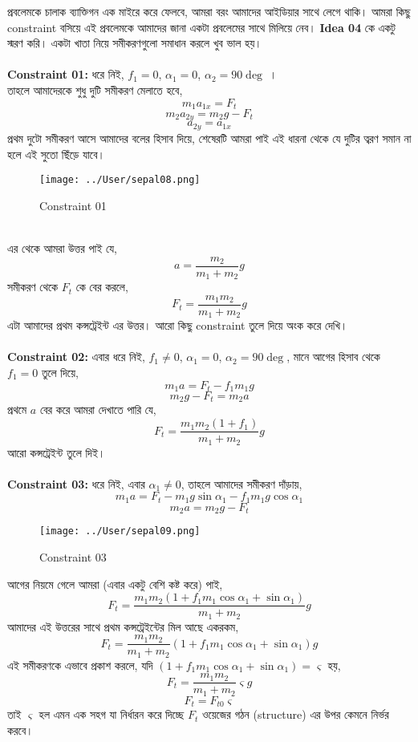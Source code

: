 \documentclass[12pt,a4paper]{article}
\begin{document}
প্রবলেমকে চালাক ব্যাক্তিগন এক মাইরে করে ফেলবে, আমরা বরং আমাদের আইডিয়ার সাথে লেগে থাকি। আমরা কিছু constraint বসিয়ে এই প্রবলেমকে আমাদের জানা একটা প্রবলেমের সাথে মিলিয়ে নেব। \textbf{Idea 04} কে একটু স্মরণ করি। একটা খাতা নিয়ে  সমীকরণগুলো সমাধান করলে খুব ভাল হয়। \\
\\
\textbf{Constraint 01:} ধরে নিই, $f_1 = 0$, $ \alpha_1 = 0$, $ \alpha_2 = 90\deg$ ।\\ 
তাহলে আমাদেরকে শুধু দুটি সমীকরণ মেলাতে হবে, 
\[ m_1 a_{1x} = F_t \]
\[ m_2 a_{2y} = m_2g - F_t \]
\[ a_{2y} = a_{1x} \]
প্রথম দুটো সমীকরণ আসে আমাদের বলের হিসাব দিয়ে, শেষেরটি আমরা পাই এই ধারনা থেকে যে দুটির ত্বরণ সমান না হলে এই সুতো ছিঁড়ে যাবে। \\
\begin{figure}
\texttt{[image: ../User/sepal08.png]}
\centering
\caption{Constraint 01}
\end{figure}\\
এর থেকে আমরা উত্তর পাই যে,
\[ a = \frac{m_2}{m_1 + m_2} g \]
সমীকরণ থেকে $F_t$ কে বের করলে,
\[F_t = \frac{m_1m_2}{m_1 + m_2} g \]
এটা আমাদের প্রথম কন্সট্রেইন্ট এর উত্তর। আরো কিছু constraint তুলে দিয়ে অংক করে দেখি। \\
\\
\textbf{Constraint 02:} এবার ধরে নিই, $f_1 \neq 0$, $ \alpha_1 = 0$, $ \alpha_2 = 90\deg$, মানে আগের হিসাব থেকে $f_1 = 0$ তুলে দিয়ে, 
\[ m_1 a = F_t - f_1 m_1 g \]
\[ m_2 g - F_t = m_2 a \]
প্রথমে $a$ বের করে আমরা দেখাতে পারি যে,
\[ F_t =  \frac{m_1m_2 (1 + f_1) }{m_1 + m_2} g \]
আরো কন্সট্রেইন্ট তুলে দিই। \\
\\
\textbf{Constraint 03:} ধরে নিই, এবার $\alpha_1 \neq 0$, তাহলে আমাদের সমীকরণ দাঁড়ায়, 
\[ m_1 a = F_t - m_1 g \sin \alpha_1 - f_1 m_1 g \cos \alpha_1 \]
\[ m_2 a = m_2g - F_t \]
\begin{figure}[hbtp]
\centering
\texttt{[image: ../User/sepal09.png]}
\caption{Constraint 03}
\end{figure}
আগের নিয়মে গেলে আমরা (এবার একটু বেশি কষ্ট করে) পাই, %
\[ F_t = \frac{m_1 m_2 (1 + f_1 m_1 \cos \alpha_1 + \sin \alpha_1)}
  {m_1 + m_2} g \]
আমাদের এই উত্তরের সাথে প্রথম কন্সট্রেইন্টের মিল আছে একরকম, 
\[ F_t = \frac{m_1 m_2 }{m_1 + m_2} (1 + f_1 m_1 \cos \alpha_1 + \sin \alpha_1) g \]
এই সমীকরণকে এভাবে প্রকাশ করলে, যদি $(1 + f_1 m_1 \cos \alpha_1 + \sin \alpha_1) = \varsigma$ হয়,
\[ F_t = \frac{m_1 m_2 }{m_1 + m_2} \varsigma g \]
\[ F_t =  F_{t0} \varsigma \]
তাই $\varsigma$ হল এমন এক সহগ যা নির্ধারন করে দিচ্ছে $F_t$ ওয়েজের গঠন (structure) এর উপর কেমনে নির্ভর করবে। \\
\end{document}
